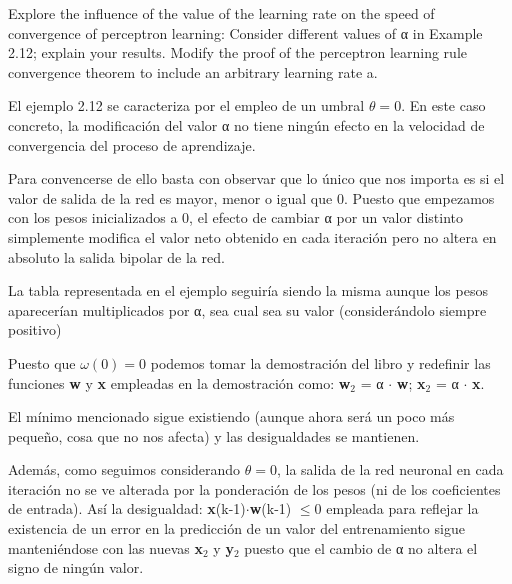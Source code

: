 \begin{problem}[8]
Explore the influence of the value of the learning rate on the speed of convergence
of perceptron learning:
\ppart Consider different values of α in Example 2.12; explain your results.
\ppart Modify the proof of the perceptron learning rule convergence theorem to include
an arbitrary learning rate a.
\solution

\spart

El ejemplo 2.12 se caracteriza por el empleo de un umbral $\theta = 0$. En este caso concreto, la modificación del valor α no tiene ningún efecto en la velocidad de convergencia del proceso de aprendizaje.

Para convencerse de ello basta con observar que lo único que nos importa es si el valor de salida de la red es mayor, menor o igual que 0. Puesto que empezamos con los pesos inicializados a 0, el efecto de cambiar α por un valor distinto simplemente modifica el valor neto obtenido en cada iteración pero no altera en absoluto la salida bipolar de la red.

La tabla representada en el ejemplo seguiría siendo la misma aunque los pesos aparecerían multiplicados por α, sea cual sea su valor (considerándolo siempre positivo)

\spart

Puesto que $ω(0)=0$ podemos tomar la demostración del libro y redefinir las funciones \textbf{w} y \textbf{x} empleadas en la demostración como: \textbf{w}$_2$ = α $\cdot$ \textbf{w}; \textbf{x}$_2$ = α $\cdot$ \textbf{x}.

El mínimo mencionado sigue existiendo (aunque ahora será un poco más pequeño, cosa que no nos afecta) y las desigualdades se mantienen.

Además, como seguimos considerando $\theta = 0$, la salida de la red neuronal en cada iteración no se ve alterada por la ponderación de los pesos (ni de los coeficientes de entrada). Así la desigualdad: \textbf{x}(k-1)$\cdot$\textbf{w}(k-1) $\leq 0$ empleada para reflejar la existencia de un error en la predicción de un valor del entrenamiento sigue manteniéndose con las nuevas  \textbf{x}$_2$ y \textbf{y}$_2$ puesto que el cambio de α no altera el signo de ningún valor.
\end{problem}

